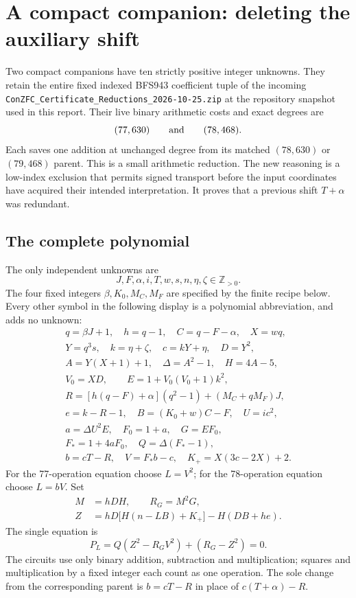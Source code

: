 \section{A compact companion: deleting the auxiliary shift}
\label{sec:compact-shift}

Two compact companions have ten strictly positive integer unknowns.  They
retain the entire fixed indexed BFS943 coefficient tuple of the incoming
\texttt{ConZFC\_Certificate\_Reductions\_2026-10-25.zip} at the repository
snapshot used in this report.  Their live binary arithmetic costs and exact
degrees are
\[
 (77,630)\qquad\hbox{and}\qquad(78,468).
\]
Each saves one addition at unchanged degree from its matched $(78,630)$ or
$(79,468)$ parent. This is a small arithmetic reduction. The new reasoning
is a low-index exclusion that permits signed transport before the input
coordinates have acquired their intended interpretation. It proves that a
previous shift $T+\alpha$ was redundant.

\subsection{The complete polynomial}

The only independent unknowns are
\[
 J,F,\alpha,i,T,w,s,n,\eta,\zeta\in\mathbb Z_{>0}.
\]
The four fixed integers $\beta,K_0,M_C,M_F$ are specified by the finite
recipe below. Every other symbol in the following display is a polynomial
abbreviation, and adds no unknown:
\begin{gather*}
 q=\beta J+1,\quad h=q-1,\quad C=q-F-\alpha,\quad X=wq,\\
 Y=q^3s,\quad k=\eta+\zeta,\quad c=kY+\eta,\quad D=Y^2,\\
 A=Y(X+1)+1,\quad \Delta=A^2-1,\quad H=4A-5,\\
 V_0=XD,\qquad E=1+V_0(V_0+1)k^2,\\
 R=[h(q-F)+\alpha](q^2-1)+(M_C+qM_F)J,\\
 e=k-R-1,\quad B=(K_0+w)C-F,\quad U=ic^2,\\
 a=\Delta U^2E,\quad F_0=1+a,\quad G=EF_0,\\
 F_*=1+4aF_0,\quad Q=\Delta(F_*-1),\\
 b=cT-R,\quad V=F_*b-c,\quad K_+=X(3c-2X)+2.
\end{gather*}
For the 77-operation equation choose $L=V^2$; for the 78-operation
equation choose $L=bV$. Set
\begin{align*}
 M&=hDH,\qquad R_G=M^2G,\\
 Z&=hD\bigl[H(n-LB)+K_+\bigr]-H(DB+he).
\end{align*}
The single equation is
\begin{equation}
 \boxed{\;P_L=Q(Z^2-R_GV^2)+(R_G-Z^2)=0.\;}
 \label{eq:compact-shift-deleted}
\end{equation}
The circuits use only binary addition, subtraction and multiplication;
squares and multiplication by a fixed integer each count as one operation.
The sole change from the corresponding parent is $b=cT-R$ in place of
$c(T+\alpha)-R$.

